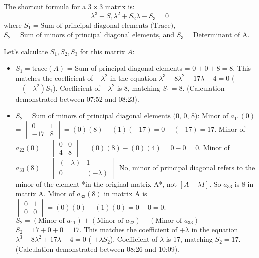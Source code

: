 \documentclass{article}
\begin{document}
The shortcut formula for a $3 \times 3$ matrix is:
\[ \lambda^3 - S_1 \lambda^2 + S_2 \lambda - S_3 = 0 \]
where $S_1 = \text{Sum of principal diagonal elements (Trace)}$, $S_2 = \text{Sum of minors of principal diagonal elements}$, and $S_3 = \text{Determinant of A}$.

Let's calculate $S_1, S_2, S_3$ for this matrix $A$:

\begin{itemize}
    \item $S_1 = \text{trace}(A)$ = Sum of principal diagonal elements = $0 + 0 + 8 = 8$.
     This matches the coefficient of $-\lambda^2$ in the equation $\lambda^3 - 8\lambda^2 + 17\lambda - 4 = 0$ ($ -(-\lambda^2) S_1$). Coefficient of $-\lambda^2$ is 8, matching $S_1=8$. (Calculation demonstrated between 07:52 and 08:23).

    \item $S_2 = \text{Sum of minors of principal diagonal elements (0, 0, 8)}$:
    Minor of $a_{11} (0)$ = $\begin{vmatrix} 0 & 1 \\ -17 & 8 \end{vmatrix} = (0)(8) - (1)(-17) = 0 - (-17) = 17$.
    Minor of $a_{22} (0)$ = $\begin{vmatrix} 0 & 0 \\ 4 & 8 \end{vmatrix} = (0)(8) - (0)(4) = 0 - 0 = 0$.
    Minor of $a_{33} (8)$ = $\begin{vmatrix} (-\lambda) & 1 \\ 0 & (-\lambda) \end{vmatrix}$ No, minor of principal diagonal refers to the minor of the element *in the original matrix A*, not $[A-\lambda I]$. So $a_{33}$ is 8 in matrix A.
    Minor of $a_{33} (8)$ in matrix A is $\begin{vmatrix} 0 & 1 \\ 0 & 0 \end{vmatrix} = (0)(0) - (1)(0) = 0 - 0 = 0$.
    $S_2 = (\text{Minor of } a_{11}) + (\text{Minor of } a_{22}) + (\text{Minor of } a_{33})$
    $S_2 = 17 + 0 + 0 = 17$.
    This matches the coefficient of $+\lambda$ in the equation $\lambda^3 - 8\lambda^2 + 17\lambda - 4 = 0$ ( $+ \lambda S_2$). Coefficient of $\lambda$ is 17, matching $S_2=17$. (Calculation demonstrated between 08:26 and 10:09).


\end{itemize}
\end{document}
